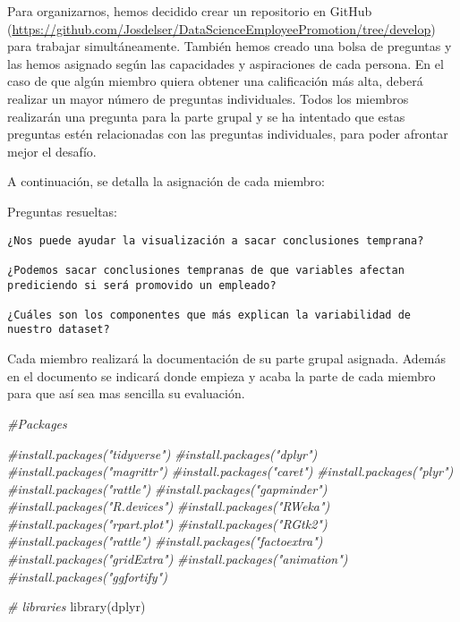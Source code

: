 \documentclass[
]{article}
\newenvironment{Shaded}{\begin{snugshade}}{\end{snugshade}}
\newcommand{\CommentTok}[1]{\textcolor[rgb]{0.56,0.35,0.01}{\textit{#1}}}
\newcommand{\FunctionTok}[1]{\textcolor[rgb]{0.00,0.00,0.00}{#1}}
\newcommand{\NormalTok}[1]{#1}
\begin{document}
Para organizarnos, hemos decidido crear un repositorio en GitHub
(\url{https://github.com/Josdelser/DataScienceEmployeePromotion/tree/develop})
para trabajar simultáneamente. También hemos creado una bolsa de
preguntas y las hemos asignado según las capacidades y aspiraciones de
cada persona. En el caso de que algún miembro quiera obtener una
calificación más alta, deberá realizar un mayor número de preguntas
individuales. Todos los miembros realizarán una pregunta para la parte
grupal y se ha intentado que estas preguntas estén relacionadas con las
preguntas individuales, para poder afrontar mejor el desafío.

A continuación, se detalla la asignación de cada miembro:

Preguntas resueltas:

\begin{verbatim}
¿Nos puede ayudar la visualización a sacar conclusiones temprana?

¿Podemos sacar conclusiones tempranas de que variables afectan prediciendo si será promovido un empleado?

¿Cuáles son los componentes que más explican la variabilidad de nuestro dataset?
\end{verbatim}

Cada miembro realizará la documentación de su parte grupal asignada.
Además en el documento se indicará donde empieza y acaba la parte de
cada miembro para que así sea mas sencilla su evaluación.

\begin{Shaded}
\begin{Highlighting}[]
\CommentTok{\#Packages}

\CommentTok{\#install.packages("tidyverse")}
\CommentTok{\#install.packages("dplyr")}
\CommentTok{\#install.packages("magrittr")}
\CommentTok{\#install.packages("caret")}
\CommentTok{\#install.packages("plyr")}
\CommentTok{\#install.packages("rattle")}
\CommentTok{\#install.packages("gapminder")}
\CommentTok{\#install.packages("R.devices")}
\CommentTok{\#install.packages("RWeka")}
\CommentTok{\#install.packages("rpart.plot")}
\CommentTok{\#install.packages("RGtk2")}
\CommentTok{\#install.packages("rattle")}
\CommentTok{\#install.packages("factoextra")}
\CommentTok{\#install.packages("gridExtra")}
\CommentTok{\#install.packages("animation")}
\CommentTok{\#install.packages("ggfortify")}


\CommentTok{\# libraries}
\FunctionTok{library}\NormalTok{(dplyr)}
\end{Highlighting}
\end{Shaded}
\end{document}
